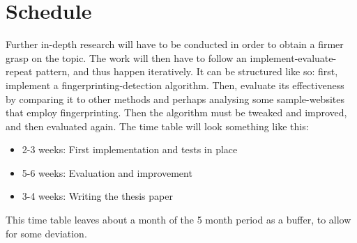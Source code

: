 \documentclass[
    fontsize=12pt,
    headings=small,
    parskip=half,
    bibliography=totoc,
    numbers=noenddot,
    open=any
    ]{scrreprt}
\begin{document}

\begingroup
\renewcommand{\cleardoublepage}{}
\renewcommand{\clearpage}{}
\chapter{Schedule} %
\endgroup
Further in-depth research will have to be conducted in order to obtain a firmer grasp on the topic.
The work will then have to follow an implement-evaluate-repeat pattern, and thus happen iteratively.
It can be structured like so: first, implement a fingerprinting-detection algorithm.
Then, evaluate its effectiveness by comparing it to other methods and perhaps analysing some sample-websites
that employ fingerprinting. Then the algorithm must be tweaked and improved, and then evaluated again.
The time table will look something like this:

\begin{itemize}
    \item
        2-3 weeks: First implementation and tests in place
    \item
        5-6 weeks: Evaluation and improvement
    \item
        3-4 weeks: Writing the thesis paper
\end{itemize}

This time table leaves about a month of the 5 month period as a buffer, to allow for some
deviation.


\clearpage

\printbibliography
\end{document}
